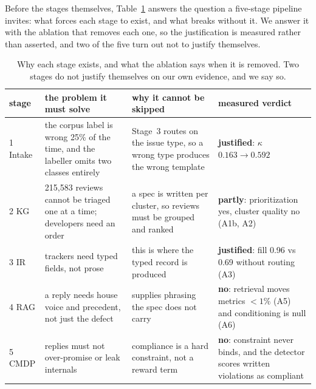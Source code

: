 \documentclass[preprint,12pt]{elsarticle}
\begin{document}
Before the stages themselves, Table~\ref{tab:why-stages} answers the question a five-stage
pipeline invites: what forces each stage to exist, and what breaks without it. We answer it with
the ablation that removes each one, so the justification is measured rather than asserted, and
two of the five turn out not to justify themselves.

\begin{table}[!htbp]\centering\footnotesize
\caption{Why each stage exists, and what the ablation says when it is removed. Two stages do not
justify themselves on our own evidence, and we say so.}\label{tab:why-stages}
\begin{tabular}{@{}p{1.5cm}p{3.4cm}p{3.4cm}p{2.6cm}@{}}\toprule
stage & the problem it must solve & why it cannot be skipped & measured verdict \\\midrule
1 Intake & the corpus label is wrong 25\% of the time, and the labeller omits two classes entirely & Stage~3 routes on the issue type, so a wrong type produces the wrong template & \textbf{justified}: $\kappa$ $0.163 \to 0.592$ \\
2 KG & 215{,}583 reviews cannot be triaged one at a time; developers need an order & a spec is written per cluster, so reviews must be grouped and ranked & \textbf{partly}: prioritization yes, cluster quality no (A1b, A2) \\
3 IR & trackers need typed fields, not prose & this is where the typed record is produced & \textbf{justified}: fill 0.96 vs 0.69 without routing (A3) \\
4 RAG & a reply needs house voice and precedent, not just the defect & supplies phrasing the spec does not carry & \textbf{no}: retrieval moves metrics $<1\%$ (A5) and conditioning is null (A6) \\
5 CMDP & replies must not over-promise or leak internals & compliance is a hard constraint, not a reward term & \textbf{no}: constraint never binds, and the detector scores written violations as compliant \\
\bottomrule\end{tabular}\end{table}
\end{document}
